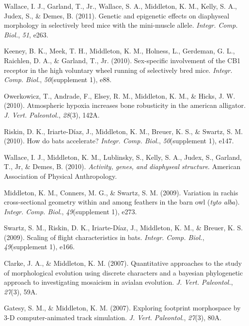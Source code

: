 \documentclass[11pt, a4paper]{awesome-cv}
\begin{document}
\leavevmode\hypertarget{ref-wallace_genetic_2011}{}%
Wallace, I. J., Garland, T., Jr., Wallace, S. A., Middleton, K. M.,
Kelly, S. A., Judex, S., \& Demes, B. (2011). Genetic and epigenetic
effects on diaphyseal morphology in selectively bred mice with the
mini-muscle allele. \emph{Integr. Comp. Biol.}, \emph{51}, e263.

\leavevmode\hypertarget{ref-keeney_sex_2010}{}%
Keeney, B. K., Meek, T. H., Middleton, K. M., Holness, L., Gerdeman, G.
L., Raichlen, D. A., \& Garland, T., Jr. (2010). Sex-specific
involvement of the CB1 receptor in the high voluntary wheel running of
selectively bred mice. \emph{Integr. Comp. Biol.}, \emph{50}(supplement
1), e88.

\leavevmode\hypertarget{ref-owerkowicz_atmospheric_2010}{}%
Owerkowicz, T., Andrade, F., Elsey, R. M., Middleton, K. M., \& Hicks,
J. W. (2010). Atmospheric hypoxia increases bone robusticity in the
american alligator. \emph{J. Vert. Paleontol.}, \emph{28}(3), 142A.

\leavevmode\hypertarget{ref-riskin_how_2010}{}%
Riskin, D. K., Iriarte-Díaz, J., Middleton, K. M., Breuer, K. S., \&
Swartz, S. M. (2010). How do bats accelerate? \emph{Integr. Comp.
Biol.}, \emph{50}(supplement 1), e147.

\leavevmode\hypertarget{ref-wallace_activity_2010}{}%
Wallace, I. J., Middleton, K. M., Lublinsky, S., Kelly, S. A., Judex,
S., Garland, T., Jr, \& Demes, B. (2010). \emph{Activity, genes, and
diaphyseal structure}. American Association of Physical Anthropology.

\leavevmode\hypertarget{ref-middleton_variation_2009}{}%
Middleton, K. M., Conners, M. G., \& Swartz, S. M. (2009). Variation in
rachis cross-sectional geometry within and among feathers in the barn
owl (\emph{tyto alba}). \emph{Integr. Comp. Biol.}, \emph{49}(supplement
1), e273.

\leavevmode\hypertarget{ref-swartz_scaling_2009}{}%
Swartz, S. M., Riskin, D. K., Iriarte-Díaz, J., Middleton, K. M., \&
Breuer, K. S. (2009). Scaling of flight characteristics in bats.
\emph{Integr. Comp. Biol.}, \emph{49}(supplement 1), e166.

\leavevmode\hypertarget{ref-clarke_quantitative_2007}{}%
Clarke, J. A., \& Middleton, K. M. (2007). Quantitative approaches to
the study of morphological evolution using discrete characters and a
bayesian phylogenetic approach to investigating mosaicism in avialan
evolution. \emph{J. Vert. Paleontol.}, \emph{27}(3), 59A.

\leavevmode\hypertarget{ref-gatesy_exploring_2007}{}%
Gatesy, S. M., \& Middleton, K. M. (2007). Exploring footprint
morphospace by 3-D computer-animated track simulation. \emph{J. Vert.
Paleontol.}, \emph{27}(3), 80A.
\end{document}
